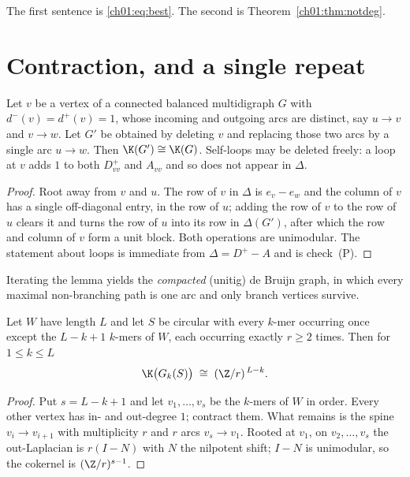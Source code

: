 The first sentence is \eqref{ch01:eq:best}. The second is Theorem~\ref{ch01:thm:notdeg}.

\section{Contraction, and a single repeat}\label{ch01:sec:repeat}

\begin{lemma}\label{ch01:lem:contract}
Let $v$ be a vertex of a connected balanced multidigraph $G$ with $d^{-}(v)=d^{+}(v)=1$,
whose incoming and outgoing arcs are distinct, say $u\to v$ and $v\to w$. Let $G'$ be
obtained by deleting $v$ and replacing those two arcs by a single arc $u\to w$. Then
$\K(G')\cong\K(G)$. Self-loops may be deleted freely: a loop at $v$ adds $1$ to both
$D^{+}_{vv}$ and $A_{vv}$ and so does not appear in $\Delta$.
\end{lemma}

\begin{proof}
Root away from $v$ and $u$. The row of $v$ in $\Delta$ is $e_v-e_w$ and the column of $v$
has a single off-diagonal entry, in the row of $u$; adding the row of $v$ to the row of $u$
clears it and turns the row of $u$ into its row in $\Delta(G')$, after which the row and
column of $v$ form a unit block. Both operations are unimodular. The statement about loops
is immediate from $\Delta=D^{+}-A$ and is check~(P).
\end{proof}

Iterating the lemma yields the \emph{compacted} (unitig) de Bruijn graph, in which every
maximal non-branching path is one arc and only branch vertices survive.

\begin{theorem}\label{ch01:thm:repeat}
Let $W$ have length $L$ and let $S$ be circular with every $k$-mer occurring once except
the $L-k+1$ $k$-mers of $W$, each occurring exactly $r\ge2$ times. Then for $1\le k\le L$
\[
\K\bigl(G_k(S)\bigr)\;\cong\;(\Z/r)^{\,L-k}.
\]
\end{theorem}

\begin{proof}
Put $s=L-k+1$ and let $v_1,\dots,v_s$ be the $k$-mers of $W$ in order. Every other vertex
has in- and out-degree $1$; contract them. What remains is the spine $v_i\to v_{i+1}$ with
multiplicity $r$ and $r$ arcs $v_s\to v_1$. Rooted at $v_1$, on $v_2,\dots,v_s$ the
out-Laplacian is $r(I-N)$ with $N$ the nilpotent shift; $I-N$ is unimodular, so the
cokernel is $(\Z/r)^{s-1}$.
\end{proof}

